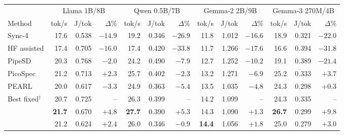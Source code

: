 \begin{tabular}{@{}lrrrrrrrrrrrr@{}}
\toprule
 & \multicolumn{3}{c}{Llama 1B/8B} & \multicolumn{3}{c}{Qwen 0.5B/7B} & \multicolumn{3}{c}{Gemma-2 2B/9B} & \multicolumn{3}{c}{Gemma-3 270M/4B}\\
\cmidrule(lr){2-4}\cmidrule(lr){5-7}\cmidrule(lr){8-10}\cmidrule(lr){11-13}
Method & tok/s & J/tok & $\Delta$\% & tok/s & J/tok & $\Delta$\% & tok/s & J/tok & $\Delta$\% & tok/s & J/tok & $\Delta$\%\\
\midrule
Sync-4 & 17.6 & 0.538 & $-14.9$ & 19.2 & 0.346 & $-26.9$ & 11.8 & 1.012 & $-16.6$ & 18.9 & 0.321 & $-22.0$ \\
HF assisted & 17.4 & 0.705 & $-16.0$ & 17.4 & 0.420 & $-33.8$ & 11.7 & 1.266 & $-17.6$ & 16.6 & 0.394 & $-31.8$ \\
PipeSD & 20.3 & 0.768 & $-2.0$ & 24.2 & 0.490 & $-7.9$ & 12.7 & 1.252 & $-10.2$ & 19.1 & 0.389 & $-21.4$ \\
PicoSpec & 21.2 & 0.713 & $+2.3$ & 25.7 & 0.402 & $-2.3$ & 13.2 & 1.271 & $-6.9$ & 25.2 & 0.333 & $+3.7$ \\
PEARL & 20.0 & 0.617 & $-3.3$ & 24.9 & 0.363 & $-5.4$ & 13.5 & 1.035 & $-4.8$ & 24.3 & 0.298 & $+0.3$ \\
Best fixed$^\dagger$ & 20.7 & 0.725 & -- & 26.3 & 0.399 & -- & 14.2 & 1.099 & -- & 24.3 & 0.335 & -- \\
\textbf{\capes{}} & \textbf{21.7} & 0.670 & $+4.8$ & \textbf{27.7} & 0.390 & $+5.3$ & 14.3 & 1.090 & $+1.3$ & \textbf{26.7} & 0.299 & $+9.8$ \\
\textbf{\capee{}} & 21.2 & 0.624 & $+2.4$ & 26.0 & 0.346 & $-0.9$ & \textbf{14.4} & 1.056 & $+1.8$ & 25.0 & 0.279 & $+3.0$ \\
\bottomrule
\end{tabular}
